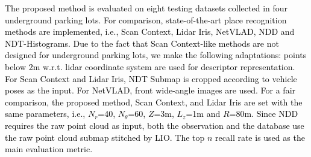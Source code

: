\documentclass[letterpaper, 10 pt, conference]{ieeeconf}   %
\newcommand\kevin[1]{\textcolor{black}{#1}}
\begin{document}
\kevin{The proposed method is evaluated on eight testing datasets collected in four underground parking lots. For comparison, state-of-the-art place recognition methods are implemented, i.e., Scan Context\cite{kim2018scan}, Lidar Iris\cite{wang2020lidar}, NetVLAD\cite{arandjelovic2016netvlad}, NDD\cite{NDD} and NDT-Histograms\cite{ndt_histograms}. Due to the fact that Scan Context-like methods are not designed for underground parking lots, we make the following adaptations: points below 2m w.r.t. lidar coordinate system are used for descriptor representation. For Scan Context and Lidar Iris, NDT Submap is cropped according to vehicle poses as the input. For NetVLAD, front wide-angle images are used. For a fair comparison, the proposed method, Scan Context, and Lidar Iris are set with the same parameters, i.e., $N_r$=40, $N_\theta$=60, $Z$=3m, $L_z$=1m and $R$=80m. Since NDD requires the raw point cloud as input, both the observation and the database use the raw point cloud submap stitched by LIO. The top $n$ recall rate is used as the main evaluation metric.}
\end{document}
